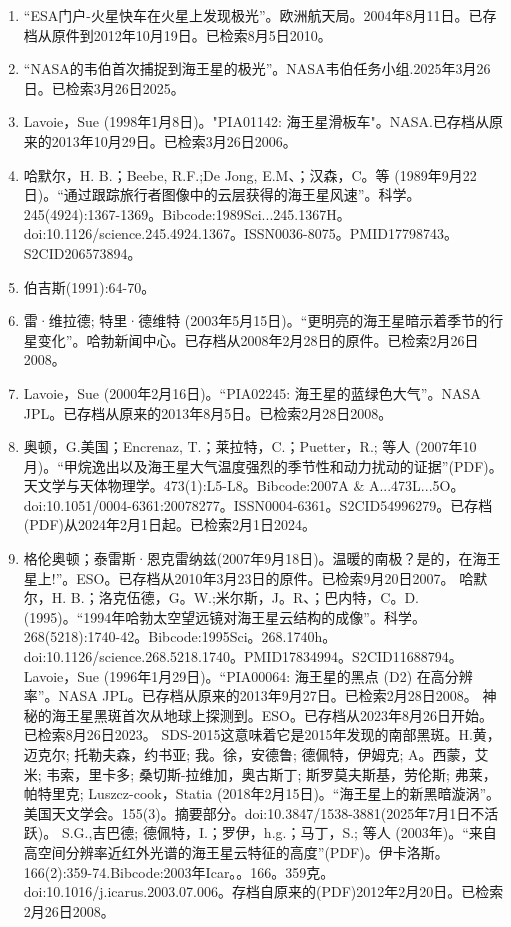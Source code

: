 \begin{enumerate}
\item “ESA门户-火星快车在火星上发现极光”。欧洲航天局。2004年8月11日。已存档从原件到2012年10月19日。已检索8月5日2010。
\item “NASA的韦伯首次捕捉到海王星的极光”。NASA韦伯任务小组.2025年3月26日。已检索3月26日2025。
\item Lavoie，Sue (1998年1月8日)。"PIA01142: 海王星滑板车"。NASA.已存档从原来的2013年10月29日。已检索3月26日2006。
\item 哈默尔，H. B.；Beebe, R.F.;De Jong, E.M、；汉森，C。等 (1989年9月22日)。“通过跟踪旅行者图像中的云层获得的海王星风速”。科学。245(4924):1367-1369。Bibcode:1989Sci...245.1367H。doi:10.1126/science.245.4924.1367。ISSN0036-8075。PMID17798743。S2CID206573894。   
\item 伯吉斯(1991):64-70。
\item 雷·维拉德; 特里·德维特 (2003年5月15日)。“更明亮的海王星暗示着季节的行星变化”。哈勃新闻中心。已存档从2008年2月28日的原件。已检索2月26日2008。
\item Lavoie，Sue (2000年2月16日)。“PIA02245: 海王星的蓝绿色大气”。NASA JPL。已存档从原来的2013年8月5日。已检索2月28日2008。
\item 奥顿，G.美国；Encrenaz, T.；莱拉特，C.；Puetter，R.; 等人 (2007年10月)。“甲烷逸出以及海王星大气温度强烈的季节性和动力扰动的证据”(PDF)。天文学与天体物理学。473(1):L5-L8。Bibcode:2007A & A...473L...5O。doi:10.1051/0004-6361:20078277。ISSN0004-6361。S2CID54996279。已存档(PDF)从2024年2月1日起。已检索2月1日2024。   
\item 格伦奥顿；泰雷斯·恩克雷纳兹(2007年9月18日)。温暖的南极？是的，在海王星上!”。ESO。已存档从2010年3月23日的原件。已检索9月20日2007。
 哈默尔，H. B.；洛克伍德，G。W.;米尔斯，J。R、；巴内特，C。D.(1995)。“1994年哈勃太空望远镜对海王星云结构的成像”。科学。268(5218):1740-42。Bibcode:1995Sci。268.1740h。doi:10.1126/science.268.5218.1740。PMID17834994。S2CID11688794。  
 Lavoie，Sue (1996年1月29日)。“PIA00064: 海王星的黑点 (D2) 在高分辨率”。NASA JPL。已存档从原来的2013年9月27日。已检索2月28日2008。
 神秘的海王星黑斑首次从地球上探测到。ESO。已存档从2023年8月26日开始。已检索8月26日2023。
 SDS-2015这意味着它是2015年发现的南部黑斑。H.黄，迈克尔; 托勒夫森，约书亚; 我。徐，安德鲁; 德佩特，伊姆克; A。西蒙，艾米; 韦索，里卡多; 桑切斯-拉维加，奥古斯丁; 斯罗莫夫斯基，劳伦斯; 弗莱，帕特里克; Luszcz-cook，Statia (2018年2月15日)。“海王星上的新黑暗漩涡”。美国天文学会。155(3)。摘要部分。doi:10.3847/1538-3881(2025年7月1日不活跃)。
 S.G.,吉巴德; 德佩特，I.；罗伊，h.g.；马丁，S.; 等人 (2003年)。“来自高空间分辨率近红外光谱的海王星云特征的高度”(PDF)。伊卡洛斯。166(2):359-74.Bibcode:2003年Icar。。166。359克。doi:10.1016/j.icarus.2003.07.006。存档自原来的(PDF)2012年2月20日。已检索2月26日2008。

\end{enumerate}
